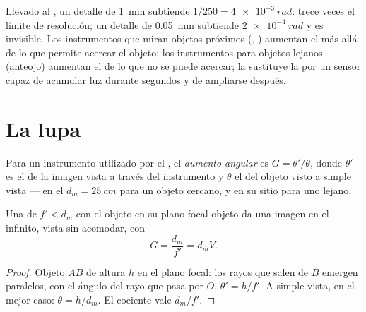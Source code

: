 \begin{remark}\label{rem:b1:optical-instruments:purpose}
Llevado al , un detalle de \qty{1}{mm} subtiende $1/250 =
\qty{4e-3}{rad}$: trece veces el límite de resolución; un detalle de
\qty{0.05}{mm} subtiende $\qty{2e-4}{rad}$ y es invisible. Los
instrumentos que miran objetos próximos (, ) aumentan el
 más allá de lo que permite acercar el objeto; los
instrumentos para objetos lejanos (anteojo) aumentan el  de
lo que no se puede acercar; la  sustituye la  por un sensor
capaz de acumular luz durante segundos y de ampliarse después.
\end{remark}

\section{La lupa}

\begin{definition}\label{def:b1:optical-instruments:G}
Para un instrumento utilizado por el , el \emph{aumento angular} es
$G = \theta'/\theta$, donde $\theta'$ es el  de la imagen
vista a través del instrumento y $\theta$ el  del objeto
visto a simple vista --- en el  $d_m = \qty{25}{cm}$ para un
objeto cercano, y en su sitio para uno lejano.
\end{definition}

\begin{proposition}[La lupa]\label{prop:b1:optical-instruments:loupe}
Una  de  $f' < d_m$ con el objeto en su
plano focal objeto da una imagen en el infinito, vista sin acomodar,
con
\[
G = \frac{d_m}{f'} = d_m V .
\]
\end{proposition}

\begin{proof}
Objeto $AB$ de altura $h$ en el plano focal: los rayos que salen de $B$
emergen paralelos, con el ángulo del rayo que pasa por $O$,
$\theta' = h/f'$. A simple vista, en el mejor caso: $\theta = h/d_m$. El
cociente vale $d_m/f'$.
\end{proof}

